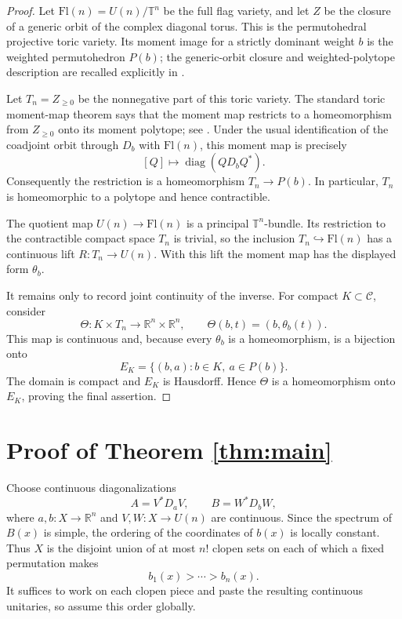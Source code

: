 \documentclass[11pt]{article}
\newcommand{\R}{\mathbb R}
\newcommand{\diag}{\operatorname{diag}}
\begin{document}
\begin{proof}
Let $\mathrm{Fl}(n)=U(n)/\mathbb T^n$ be the full flag variety, and let $Z$ be
the closure of a generic orbit of the complex diagonal torus.  This is the
permutohedral projective toric variety.  Its moment image for a strictly
dominant weight $b$ is the weighted permutohedron $P(b)$; the generic-orbit
closure and weighted-polytope description are recalled explicitly in
\cite[Sections 2.3--2.4]{LIAN}.

Let $T_n=Z_{\geq0}$ be the nonnegative part of this toric variety.  The standard
toric moment-map theorem says that the moment map restricts to a homeomorphism
from $Z_{\geq0}$ onto its moment polytope; see \cite[Theorem 8.5]{SOTTILE}.
Under the usual identification of the coadjoint orbit through $D_b$ with
$\mathrm{Fl}(n)$, this moment map is precisely
\[
               [Q]\longmapsto\diag(QD_bQ^*).
\]
Consequently the restriction is a homeomorphism $T_n\to P(b)$.  In
particular, $T_n$ is homeomorphic to a polytope and hence contractible.

The quotient map $U(n)\to\mathrm{Fl}(n)$ is a principal $\mathbb T^n$-bundle.
Its restriction to the contractible compact space $T_n$ is trivial, so the
inclusion $T_n\hookrightarrow\mathrm{Fl}(n)$ has a continuous lift
$R:T_n\to U(n)$.  With this lift the moment map has the displayed form
$\theta_b$.

It remains only to record joint continuity of the inverse.  For compact
$K\subset\mathcal C$, consider
\[
 \Theta:K\times T_n\longrightarrow\R^n\times\R^n,
 \qquad \Theta(b,t)=(b,\theta_b(t)).
\]
This map is continuous and, because every $\theta_b$ is a homeomorphism, is a
bijection onto
\[
              E_K=\{(b,a):b\in K,\ a\in P(b)\}.
\]
The domain is compact and $E_K$ is Hausdorff.  Hence $\Theta$ is a
homeomorphism onto $E_K$, proving the final assertion.
\end{proof}

\section{Proof of Theorem \ref{thm:main}}

Choose continuous diagonalizations
\[
 A=V^*D_aV,\qquad B=W^*D_bW,
\]
where $a,b:X\to\R^n$ and $V,W:X\to U(n)$ are continuous.  Since the spectrum
of $B(x)$ is simple, the ordering of the coordinates of $b(x)$ is locally
constant.  Thus $X$ is the disjoint union of at most $n!$ clopen sets on each
of which a fixed permutation makes
\[
                 b_1(x)>\cdots>b_n(x).
\]
It suffices to work on each clopen piece and paste the resulting continuous
unitaries, so assume this order globally.
\end{document}
